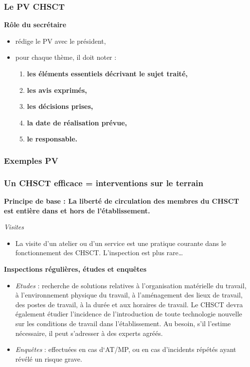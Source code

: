 \documentclass{beamer}
\begin{document}
\begin{frame}
\frametitle{Le PV CHSCT}

\textbf{Rôle du secrétaire}
\begin{itemize}
\item rédige le PV avec le président,

\item pour chaque thème, il doit noter : 
\begin{enumerate}
\item \textbf{les éléments essentiels décrivant le sujet traité,}

\item \textbf{les avis exprimés,} 

\item \textbf{les décisions prises,} 

\item \textbf{la date de réalisation prévue,} 

\item \textbf{le responsable.}
\end{enumerate}
\end{itemize}
\end{frame}

\begin{frame}
\frametitle{Exemples PV}

\end{frame}

\begin{frame}
\frametitle{Un CHSCT efficace = interventions sur le terrain}


\textbf{Principe de base :  La liberté de circulation des membres du CHSCT est entière dans et hors de l’établissement.}

\textit{Visites}

\begin{itemize}
\item La visite d’un atelier ou d’un service est une pratique courante dans le fonctionnement des CHSCT. L’inspection est plus rare…
\end{itemize}
\textbf{Inspections régulières, études et enquêtes}
\begin{itemize}
\item \textit{Etudes} : recherche de solutions relatives à l'organisation matérielle du travail, à l'environnement physique du travail, à l'aménagement des lieux de travail, des postes de travail, à la durée et aux horaires de travail. Le CHSCT devra également étudier l'incidence de l'introduction de toute technologie nouvelle sur les conditions de travail dans l'établissement. Au besoin, s'il l'estime nécessaire, il peut s'adresser à des experts agréés.
\item \textit{Enquêtes} : effectuées en cas d‘AT/MP, ou en cas d'incidents répétés ayant révélé un risque grave. 
\end{itemize}
\end{frame}
\end{document}
